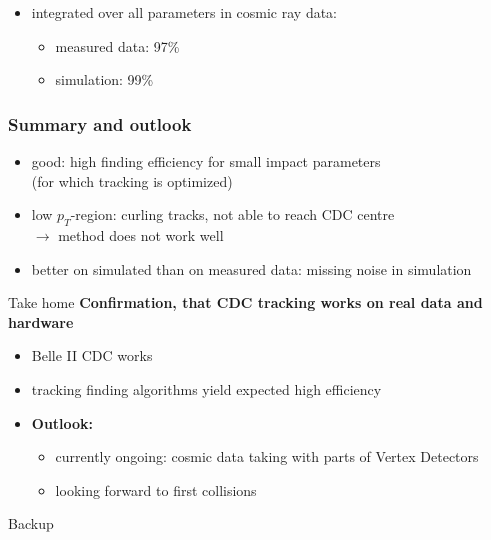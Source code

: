 \documentclass[18pt, aspectratio=169]{beamer}
\newcommand{\kitemph}[1]{\textcolor{kit-green100}{\bf{#1}}}
\begin{document}
\begin{frame}
\begin{columns}
\begin{column}{0.5\textwidth}
    \end{column}
  \end{columns}
  \begin{itemize}
  \item integrated over all parameters in cosmic ray data:
    \begin{itemize}
    \item measured data: 97\%
    \item simulation: 99\%
    \end{itemize}
  \end{itemize}
\end{frame}



\begin{frame}
  \frametitle{Summary and outlook}
  \begin{itemize}
  \item good: high finding efficiency for small impact parameters\\(for which tracking is optimized)
  \item low $p_T$-region: curling tracks, not able to reach CDC centre\\
    $\rightarrow$ method does not work well
  \item better on simulated than on measured data: missing noise in simulation
  \end{itemize}

  \begin{block}{Take home}
    \kitemph{Confirmation, that CDC tracking works on real data and hardware}
    \begin{itemize}
    \item Belle II CDC works
    \item tracking finding algorithms yield expected high efficiency
    \end{itemize}
  \end{block}
  \begin{itemize}
  \item \textbf{Outlook:}
    \begin{itemize}
    \item currently ongoing: cosmic data taking with parts of Vertex
      Detectors
    \item looking forward to first collisions
    \end{itemize}
  \end{itemize}
\end{frame}



\appendix
\backupbegin
\begin{frame}
  \centering \huge
  Backup
\end{frame}
\end{document}
